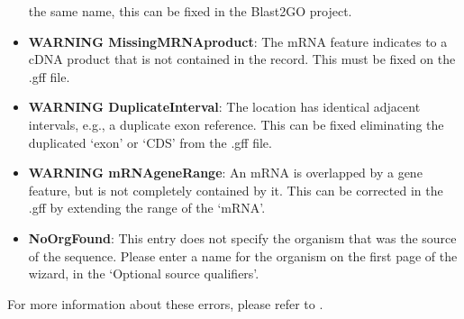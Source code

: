 \begin{itemize}
 the same name, this can be fixed in the Blast2GO project.
 \item \textbf{WARNING MissingMRNAproduct}: The mRNA feature indicates to a cDNA
 product that is not contained in the record. This must be fixed on the .gff
 file.
 \item \textbf{WARNING DuplicateInterval}: The location has identical adjacent
 intervals, e.g., a duplicate exon reference. This can be fixed eliminating the
 duplicated `exon' or `CDS' from the .gff file.
 \item \textbf{WARNING mRNAgeneRange}: An mRNA is overlapped by a gene feature,
 but is not completely contained by it. This can be corrected in the .gff by
 extending the range of the `mRNA'.
 \item \textbf{NoOrgFound}: This entry does not specify the organism that was
 the source of the sequence. Please enter a name for the organism on the first
 page of the wizard, in the `Optional source qualifiers'.
\end{itemize}

For more information about these errors, please refer to
.







